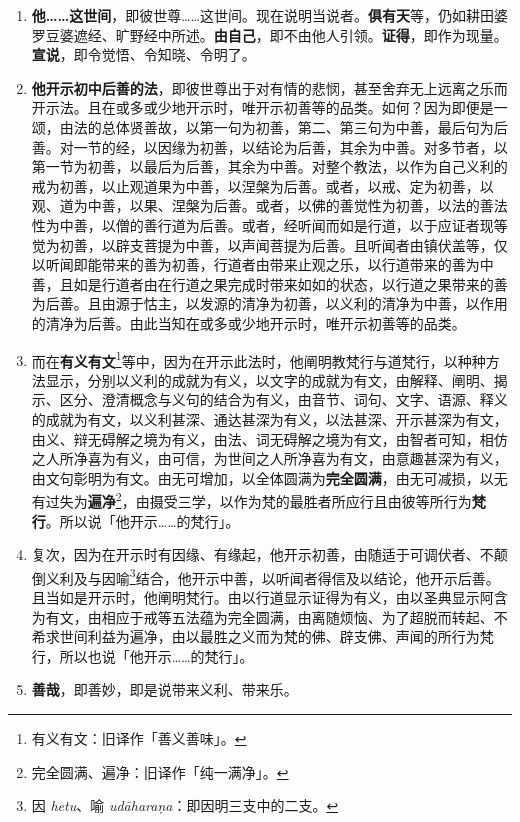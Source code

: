 \begin{enumerate}
\item \textbf{他……这世间}，即彼世尊……这世间。现在说明当说者。\textbf{俱有天}等，仍如耕田婆罗豆婆遮经、旷野经中所述。\textbf{由自己}，即不由他人引领。\textbf{证得}，即作为现量。\textbf{宣说}，即令觉悟、令知晓、令明了。
\item \textbf{他开示初中后善的法}，即彼世尊出于对有情的悲悯，甚至舍弃无上远离之乐而开示法。且在或多或少地开示时，唯开示初善等的品类。如何？因为即便是一颂，由法的总体贤善故，以第一句为初善，第二、第三句为中善，最后句为后善。对一节的经，以因缘为初善，以结论为后善，其余为中善。对多节者，以第一节为初善，以最后为后善，其余为中善。对整个教法，以作为自己义利的戒为初善，以止观道果为中善，以涅槃为后善。或者，以戒、定为初善，以观、道为中善，以果、涅槃为后善。或者，以佛的善觉性为初善，以法的善法性为中善，以僧的善行道为后善。或者，经听闻而如是行道，以于应证者现等觉为初善，以辟支菩提为中善，以声闻菩提为后善。且听闻者由镇伏盖等，仅以听闻即能带来的善为初善，行道者由带来止观之乐，以行道带来的善为中善，且如是行道者由在行道之果完成时带来如如的状态，以行道之果带来的善为后善。且由源于怙主，以发源的清净为初善，以义利的清净为中善，以作用的清净为后善。由此当知在或多或少地开示时，唯开示初善等的品类。
\item 而在\textbf{有义有文}\footnote{有义有文：旧译作「善义善味」。}等中，因为在开示此法时，他阐明教梵行与道梵行，以种种方法显示，分别以义利的成就为有义，以文字的成就为有文，由解释、阐明、揭示、区分、澄清概念与义句的结合为有义，由音节、词句、文字、语源、释义的成就为有文，以义利甚深、通达甚深为有义，以法甚深、开示甚深为有文，由义、辩无碍解之境为有义，由法、词无碍解之境为有文，由智者可知，相仿之人所净喜为有义，由可信，为世间之人所净喜为有文，由意趣甚深为有义，由文句彰明为有文。由无可增加，以全体圆满为\textbf{完全圆满}，由无可减损，以无有过失为\textbf{遍净}\footnote{完全圆满、遍净：旧译作「纯一满净」。}，由摄受三学，以作为梵的最胜者所应行且由彼等所行为\textbf{梵行}。所以说「他开示……的梵行」。
\item 复次，因为在开示时有因缘、有缘起，他开示初善，由随适于可调伏者、不颠倒义利及与因喻\footnote{因 \textit{hetu}、喻 \textit{udāharaṇa}：即因明三支中的二支。}结合，他开示中善，以听闻者得信及以结论，他开示后善。且当如是开示时，他阐明梵行。由以行道显示证得为有义，由以圣典显示阿含为有文，由相应于戒等五法蕴为完全圆满，由离随烦恼、为了超脱而转起、不希求世间利益为遍净，由以最胜之义而为梵的佛、辟支佛、声闻的所行为梵行，所以也说「他开示……的梵行」。
\item \textbf{善哉}，即善妙，即是说带来义利、带来乐。\end{enumerate}


